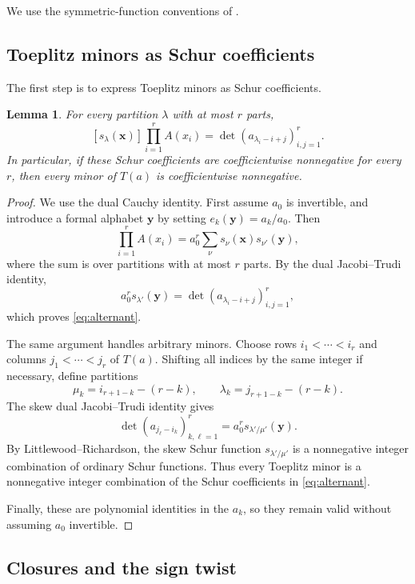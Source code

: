 \documentclass[11pt]{article}
\newtheorem{lemma}[theorem]{Lemma}
\theoremstyle{definition}
\theoremstyle{remark}
\newcommand{\xx}{\mathbf x}
\begin{document}
We use the symmetric-function conventions of
\cite[Chapter~7]{Stanley}. 

\subsection{Toeplitz minors as Schur coefficients}

The first step is to express Toeplitz minors as
Schur coefficients.

\begin{lemma}\label{lem:jt}
For every partition $\lambda$ with at most $r$ parts,
\begin{equation}\label{eq:alternant}
[s_\lambda(\xx)]\prod_{i=1}^r A(x_i)
=\det(a_{\lambda_i-i+j})_{i,j=1}^r.
\end{equation}
In particular, if these Schur coefficients are
coefficientwise nonnegative for every $r$, then
every minor of $T(a)$ is coefficientwise nonnegative.
\end{lemma}


\begin{proof}
We use the dual Cauchy identity. First assume $a_0$ is
invertible, and introduce a formal alphabet $\mathbf y$
by setting $e_k(\mathbf y)=a_k/a_0$. Then
\[
\prod_{i=1}^r A(x_i)
=a_0^r\sum_\nu s_\nu(\xx)s_{\nu'}(\mathbf y),
\]
where the sum is over partitions with at most $r$ parts.
By the dual Jacobi--Trudi identity,
\[
a_0^r s_{\lambda'}(\mathbf y)
=\det(a_{\lambda_i-i+j})_{i,j=1}^r,
\]
which proves \eqref{eq:alternant}.

The same argument handles arbitrary minors. Choose rows
$i_1<\cdots<i_r$ and columns $j_1<\cdots<j_r$ of
$T(a)$. Shifting all indices by the same integer if
necessary, define partitions
\[
\mu_k=i_{r+1-k}-(r-k),\qquad
\lambda_k=j_{r+1-k}-(r-k).
\]
The skew dual Jacobi--Trudi identity gives
\[
\det(a_{j_\ell-i_k})_{k,\ell=1}^r
=a_0^r s_{\lambda'/\mu'}(\mathbf y).
\]
By Littlewood--Richardson, the skew Schur function
$s_{\lambda'/\mu'}$ is a nonnegative integer combination
of ordinary Schur functions. Thus every Toeplitz minor
is a nonnegative integer combination of the Schur
coefficients in \eqref{eq:alternant}.

Finally, these are polynomial identities in the $a_k$,
so they remain valid without assuming $a_0$ invertible.
\end{proof}



\subsection{Closures and the sign twist}
\end{document}

